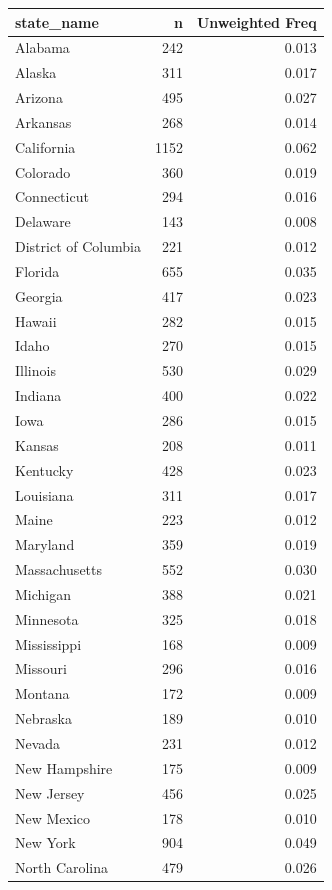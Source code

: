 \documentclass[
]{krantz}
\begin{document}
\begin{tabular}[t]{l|r|r}
\hline
state\_name & n & Unweighted Freq\\
\hline
Alabama & 242 & 0.013\\
\hline
Alaska & 311 & 0.017\\
\hline
Arizona & 495 & 0.027\\
\hline
Arkansas & 268 & 0.014\\
\hline
California & 1152 & 0.062\\
\hline
Colorado & 360 & 0.019\\
\hline
Connecticut & 294 & 0.016\\
\hline
Delaware & 143 & 0.008\\
\hline
District of Columbia & 221 & 0.012\\
\hline
Florida & 655 & 0.035\\
\hline
Georgia & 417 & 0.023\\
\hline
Hawaii & 282 & 0.015\\
\hline
Idaho & 270 & 0.015\\
\hline
Illinois & 530 & 0.029\\
\hline
Indiana & 400 & 0.022\\
\hline
Iowa & 286 & 0.015\\
\hline
Kansas & 208 & 0.011\\
\hline
Kentucky & 428 & 0.023\\
\hline
Louisiana & 311 & 0.017\\
\hline
Maine & 223 & 0.012\\
\hline
Maryland & 359 & 0.019\\
\hline
Massachusetts & 552 & 0.030\\
\hline
Michigan & 388 & 0.021\\
\hline
Minnesota & 325 & 0.018\\
\hline
Mississippi & 168 & 0.009\\
\hline
Missouri & 296 & 0.016\\
\hline
Montana & 172 & 0.009\\
\hline
Nebraska & 189 & 0.010\\
\hline
Nevada & 231 & 0.012\\
\hline
New Hampshire & 175 & 0.009\\
\hline
New Jersey & 456 & 0.025\\
\hline
New Mexico & 178 & 0.010\\
\hline
New York & 904 & 0.049\\
\hline
North Carolina & 479 & 0.026\\

\end{tabular}
\end{document}
